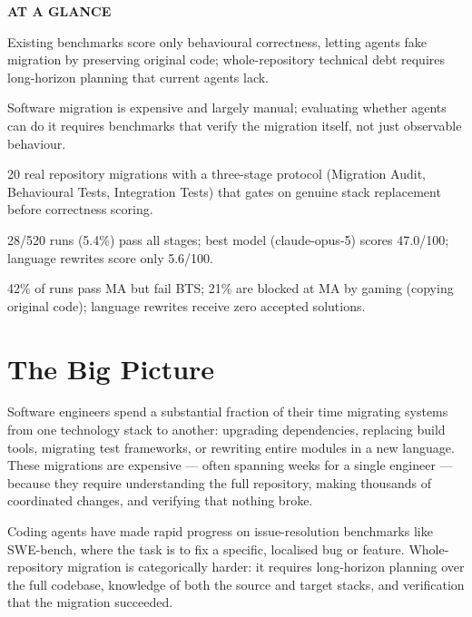 \documentclass[10pt,twocolumn]{article}
\begin{document}
\begin{mdframed}[backgroundcolor=boxgray,linecolor=rulered,linewidth=1pt,
    innerleftmargin=6pt,innerrightmargin=6pt,
    innertopmargin=6pt,innerbottommargin=6pt]
\textbf{\small AT A GLANCE}\par\vspace{4pt}
\begin{description}[leftmargin=0pt,labelsep=4pt,itemsep=2pt,parsep=0pt,
    font=\small\bfseries]
  \item[Problem:] Existing benchmarks score only behavioural correctness,
    letting agents fake migration by preserving original code; whole-repository
    technical debt requires long-horizon planning that current agents lack.
  \item[Why it matters:] Software migration is expensive and largely manual;
    evaluating whether agents can do it requires benchmarks that verify the
    migration itself, not just observable behaviour.
  \item[Method:] 20 real repository migrations with a three-stage protocol
    (Migration Audit, Behavioural Tests, Integration Tests) that gates on
    genuine stack replacement before correctness scoring.
  \item[Result:] 28/520 runs (5.4\%) pass all stages; best model
    (claude-opus-5) scores 47.0/100; language rewrites score only 5.6/100.
  \item[Evidence:] 42\% of runs pass MA but fail BTS; 21\% are blocked
    at MA by gaming (copying original code); language rewrites receive
    zero accepted solutions.
\end{description}
\end{mdframed}

\section{The Big Picture}

Software engineers spend a substantial fraction of their time migrating
systems from one technology stack to another: upgrading dependencies,
replacing build tools, migrating test frameworks, or rewriting entire
modules in a new language. These migrations are expensive — often spanning
weeks for a single engineer — because they require understanding the full
repository, making thousands of coordinated changes, and verifying that
nothing broke.

Coding agents have made rapid progress on issue-resolution benchmarks
like SWE-bench, where the task is to fix a specific, localised bug or
feature. Whole-repository migration is categorically harder: it requires
long-horizon planning over the full codebase, knowledge of both the
source and target stacks, and verification that the migration succeeded.
\end{document}
